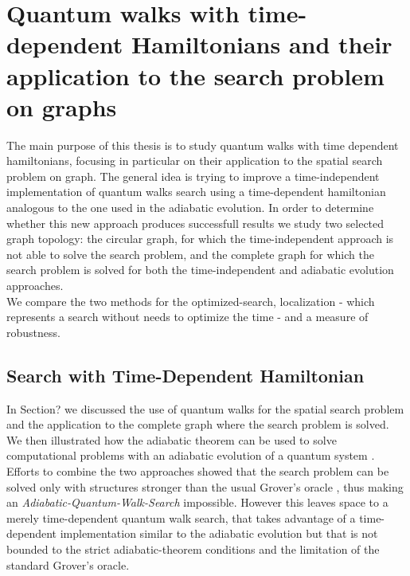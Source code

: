 \newpage
\thispagestyle{empty}
\chapter{Quantum walks with time-dependent Hamiltonians and their application to the search problem on graphs}
The main purpose of this thesis is to study quantum walks with time dependent hamiltonians, focusing in particular on their application to the spatial search problem on graph. The general idea is trying to improve a time-independent implementation of quantum walks search using a time-dependent hamiltonian analogous to the one used in the adiabatic evolution. In order to determine whether this new approach produces successfull results we study two selected graph topology: the circular graph, for which the time-independent approach is not able to solve the search problem, and the complete graph for which the search problem is solved for both the time-independent and adiabatic evolution approaches. \\ We compare the two methods for the optimized-search, localization - which represents a search without needs to optimize the time - and a measure of robustness.

\section{Search with Time-Dependent Hamiltonian}
In Section? we discussed the use of quantum walks for the spatial search problem \cite{Childs2004} and the application to the complete graph where the search problem is solved. We then illustrated how the adiabatic theorem can be used to solve computational problems with an adiabatic evolution of a quantum system \cite{Farhi2000}. Efforts to combine the two approaches showed that the search problem can be solved only with structures stronger than the usual Grover's oracle \cite{Wong2016}, thus making an \textit{Adiabatic-Quantum-Walk-Search} impossible. However this leaves space to a merely time-dependent quantum walk search, that takes advantage of a time-dependent implementation similar to the adiabatic evolution but that is not bounded to the strict adiabatic-theorem conditions and the limitation of the standard Grover's oracle.


